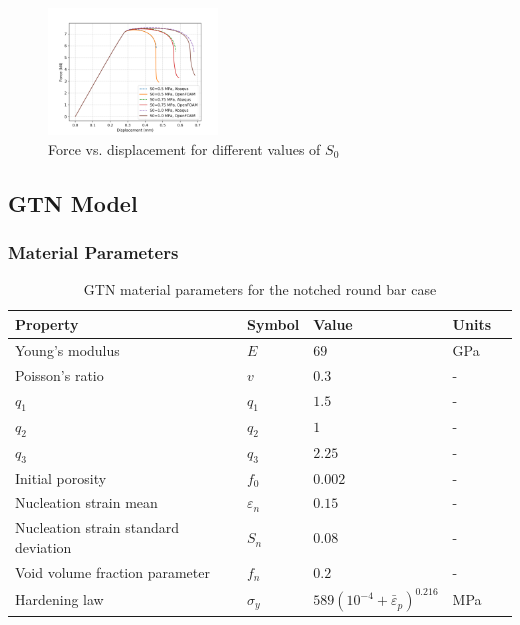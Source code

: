 \documentclass[sn-mathphys,Numbered,draft]{sn-jnl}%
\begin{document}
\begin{figure}[htb]
\begin{center}
	\includegraphics[width=0.4\textwidth]{./Figures/LemaitreCompare/borden/lemaitreBordenCompare.png}
\caption{Force vs. displacement for different values of $S_0$}
\label{fig:notchedRoundBAr}
\end{center}
\end{figure}
\FloatBarrier




\subsection{GTN Model}


\subsubsection{Material Parameters}

\begin{table}[htb]
	\centering
		\begin{tabular}{lllll} \hline
		    Property & Symbol & Value & Units  \\ \hline 
		    Young's modulus & $E$ & $69$ & GPa \\
		    Poisson's ratio & $v$ & $0.3$   & - \\
		    $q_1$ & $q_1$ & $1.5$  & -\\
		    $q_2$ & $q_2$ & $1$  & -\\
		    $q_3$ & $q_3$ & $2.25$  & -\\
		    Initial porosity & $f_0$ & $0.002$  &  -\\
		    Nucleation strain mean & $\varepsilon_n$ & $0.15$  &  -\\
		    Nucleation strain standard deviation & $S_n$ & $0.08$  &  -\\
		    Void volume fraction parameter & $f_n$ & $0.2$  & -\\
		    Hardening law & $\sigma_y$ & $589({10^{-4}+\bar{\varepsilon}}_p)^{0.216}$ & MPa  \\
		\hline
		\end{tabular}
	\caption{GTN material parameters for the notched round bar case}
	\label{table:NRB_material_properties_GTN}
\end{table}
\end{document}
